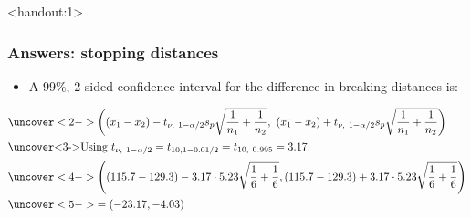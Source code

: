 \documentclass[handout]{beamer}\usepackage{graphicx, color}
\newcommand{\answers}{1}
\providecommand{\ov}[1]{\overline{#1}}
\numberwithin{equation}{section}
\begin{document}
\begin{frame}<handout:\answers>
\frametitle{Answers: stopping distances} \scriptsize
\begin{itemize}
\item A 99\%, 2-sided confidence interval for the difference in breaking distances is:
\end{itemize}
\begin{align*}
&\uncover<2->{\left ((\ov{x_1} - \ov{x}_2) - t_{\nu, \ 1 - \alpha/2} s_p \sqrt{\frac{1}{n_1} + \frac{1}{n_2}} , \ (\ov{x_1} - \ov{x}_2) + t_{\nu, \ 1 - \alpha/2} s_p \sqrt{\frac{1}{n_1} + \frac{1}{n_2}} \right )} \\
\intertext{\uncover<3->{Using $t_{\nu, \ 1 - \alpha/2} = t_{10, 1 - 0.01/2} = t_{10, \ 0.995} = 3.17$:}}
&\uncover<4->{\left ((115.7 - 129.3) - 3.17 \cdot 5.23 \sqrt{\frac{1}{6} + \frac{1}{6}} , (115.7 - 129.3) + 3.17 \cdot 5.23 \sqrt{\frac{1}{6} + \frac{1}{6}} \right )} \\
&\uncover<5->{=  (-23.17, -4.03)}
\end{align*}
\begin{itemize}
\end{itemize}
\end{frame}































\end{document}
